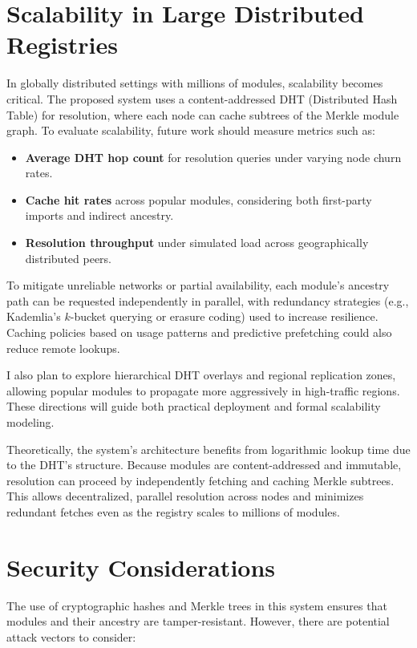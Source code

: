 \documentclass[sigplan,screen]{acmart}
\begin{document}
\section{Scalability in Large Distributed Registries}
\label{sec:scalability-distributed}

In globally distributed settings with millions of modules, scalability becomes critical. The proposed system uses a content-addressed DHT (Distributed Hash Table) for resolution, where each node can cache subtrees of the Merkle module graph. To evaluate scalability, future work should measure metrics such as:
\begin{itemize}
	\item \textbf{Average DHT hop count} for resolution queries under varying node churn rates.
	\item \textbf{Cache hit rates} across popular modules, considering both first-party imports and indirect ancestry.
	\item \textbf{Resolution throughput} under simulated load across geographically distributed peers.
\end{itemize}

To mitigate unreliable networks or partial availability, each module's ancestry path can be requested independently in parallel, with redundancy strategies (e.g., Kademlia's $k$-bucket querying or erasure coding) used to increase resilience. Caching policies based on usage patterns and predictive prefetching could also reduce remote lookups.

I also plan to explore hierarchical DHT overlays and regional replication zones, allowing popular modules to propagate more aggressively in high-traffic regions. These directions will guide both practical deployment and formal scalability modeling.

Theoretically, the system's architecture benefits from logarithmic lookup time due to the DHT's structure. Because modules are content-addressed and immutable, resolution can proceed by independently fetching and caching Merkle subtrees. This allows decentralized, parallel resolution across nodes and minimizes redundant fetches even as the registry scales to millions of modules.

\section{Security Considerations}

The use of cryptographic hashes and Merkle trees in this system ensures that modules and their ancestry are tamper-resistant. However, there are potential attack vectors to consider:
\end{document}
